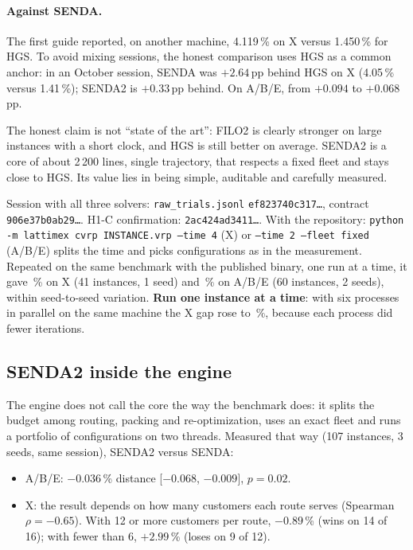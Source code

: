 \documentclass[11pt,a4paper]{article}
\newcommand{\senda}{SENDA}
\newcommand{\sendados}{SENDA2}
\newcommand{\pp}{\,pp}
\newcommand{\tsl}[1]{\texttt{\small #1}}
\begin{document}
\paragraph{Against \senda.} The first guide reported, on another machine, 4.119\,\% on X versus
1.450\,\% for HGS. To avoid mixing sessions, the honest comparison uses HGS as a common anchor: in an
October session, \senda{} was $+2.64$\pp{} behind HGS on X (4.05\,\% versus 1.41\,\%); \sendados{} is
$+0.33$\pp{} behind. On A/B/E, from $+0.094$ to $+0.068$\pp.

\begin{ideaclave}
The honest claim is not ``state of the art'': FILO2 is clearly stronger on large instances with a short
clock, and HGS is still better on average. \sendados{} is a core of about 2\,200 lines, single
trajectory, that respects a fixed fleet and stays close to HGS. Its value lies in being simple,
auditable and carefully measured.
\end{ideaclave}

\begin{reproducir}
Session with all three solvers: \tsl{raw\_trials.jsonl} \tsl{ef823740c317\ldots}, contract
\tsl{906e37b0ab29\ldots}. H1-C confirmation: \tsl{2ac424ad3411\ldots}. With the repository:
\tsl{python -m lattimex cvrp INSTANCE.vrp --time 4} (X) or \tsl{--time 2 --fleet fixed} (A/B/E) splits
the time and picks configurations as in the measurement. Repeated on the same benchmark with the
published binary, one run at a time, it gave \ReproX\,\% on X (41 instances, 1 seed) and \ReproABE\,\%
on A/B/E (60 instances, 2 seeds), within seed-to-seed variation. \textbf{Run one instance at a time}:
with six processes in parallel on the same machine the X gap rose to \ReproXParalelo\,\%, because each
process did fewer iterations.
\end{reproducir}

\subsection{\sendados{} inside the engine}
\label{sec:motor-ruteo}

The engine does not call the core the way the benchmark does: it splits the budget among routing,
packing and re-optimization, uses an exact fleet and runs a portfolio of configurations on two threads.
Measured that way (107 instances, 3 seeds, same session), \sendados{} versus \senda:

\begin{itemize}[leftmargin=1.5em]
\item A/B/E: $-0.036$\,\% distance [$-0.068$, $-0.009$], $p=0.02$.
\item X: the result depends on how many customers each route serves (Spearman $\rho=-0.65$). With 12
or more customers per route, $-0.89$\,\% (wins on 14 of 16); with fewer than 6, $+2.99$\,\% (loses on 9
of 12).
\end{itemize}
\end{document}
